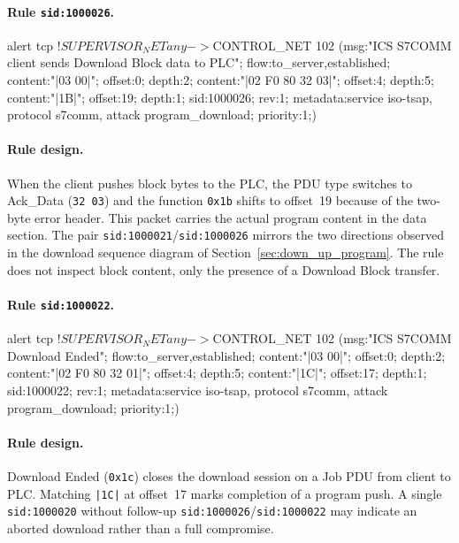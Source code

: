 \documentclass[../main.tex]{subfiles}
\begin{document}
\paragraph{Rule \texttt{sid:1000026}.}
\begin{packetdump}
alert tcp !$SUPERVISOR_NET any -> $CONTROL_NET 102 (msg:"ICS S7COMM client sends Download Block data
  to PLC"; flow:to_server,established; content:"|03 00|"; offset:0; depth:2;
  content:"|02 F0 80 32 03|"; offset:4; depth:5; content:"|1B|";
  offset:19; depth:1; sid:1000026; rev:1;
  metadata:service iso-tsap, protocol s7comm, attack program_download; priority:1;)
\end{packetdump}

\paragraph{Rule design.}
When the client pushes block bytes to the PLC, the PDU type switches to Ack\_Data (\texttt{32 03}) and the function \texttt{0x1b} shifts to offset~19 because of the two-byte error header. This packet carries the actual program content in the data section. The pair \texttt{sid:1000021}/\texttt{sid:1000026} mirrors the two directions observed in the download sequence diagram of Section~\ref{sec:down_up_program}. The rule does not inspect block content, only the presence of a Download Block transfer.

\paragraph{Rule \texttt{sid:1000022}.}
\begin{packetdump}
alert tcp !$SUPERVISOR_NET any -> $CONTROL_NET 102 (msg:"ICS S7COMM Download Ended";
  flow:to_server,established; content:"|03 00|"; offset:0; depth:2;
  content:"|02 F0 80 32 01|"; offset:4; depth:5; content:"|1C|";
  offset:17; depth:1; sid:1000022; rev:1;
  metadata:service iso-tsap, protocol s7comm, attack program_download; priority:1;)
\end{packetdump}

\paragraph{Rule design.}
Download Ended (\texttt{0x1c}) closes the download session on a Job PDU from client to PLC. Matching \texttt{|1C|} at offset~17 marks completion of a program push. A single \texttt{sid:1000020} without follow-up \texttt{sid:1000026}/\texttt{sid:1000022} may indicate an aborted download rather than a full compromise.
\end{document}
